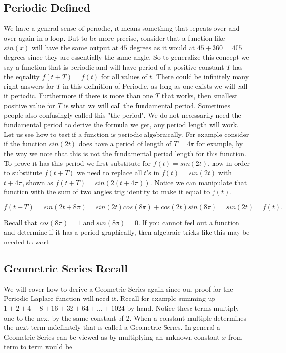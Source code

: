 \documentclass[12pt]{article}
\begin{document}
\subsection{Periodic Defined}

We have a general sense of periodic, it means something that repeats over and over again in a loop. But to be more precise, consider that a function like $sin(x)$ will have the same output at $45$ degrees as it would at $45+360=405$ degrees since they are essentially the same angle. So to generalize this concept we say a function that is periodic and will have period of a positive constant $T$ has the equality $f(t+T)=f(t)$ for all values of $t$. There could be infinitely many right answers for $T$ in this definition of Periodic, as long as one exists we will call it periodic. Furthermore if there is more than one $T$ that works, then smallest positive value for $T$ is what we will call the fundamental period. Sometimes people also confusingly called this "the period". We do not necessarily need the fundamental period to derive the formula we get, any period length will work. \\

Let us see how to test if a function is periodic algebraically. For example consider if the function $sin(2t)$ does have a period of length of $T=4\pi$ for example, by the way we note that this is not the fundamental period length for this function. To prove it has this period we first substitute for $f(t)=sin(2t)$, now in order to substitute $f(t+T)$ we need to replace all $t$'s in $f(t)=sin(2t)$ with $t+4\pi$, shown as $f(t+T)=sin(2(t+4\pi))$. Notice we can manipulate that function with the sum of two angles trig identity to make it equal to $f(t)$.

\begin{equation*}
    f(t+T)=sin(2t+8\pi)=sin(2t)cos(8\pi)+cos(2t)sin(8\pi)=sin(2t)=f(t).
\end{equation*}

Recall that $cos(8\pi)=1$ and $sin(8\pi)=0$. If you cannot feel out a function and determine if it has a period graphically, then algebraic tricks like this may be needed to work.

\subsection{Geometric Series Recall}

We will cover how to derive a Geometric Series again since our proof for the Periodic Laplace function will need it. Recall for example summing up $1+2+4+8+16+32+64+\ldots+1024$ by hand. Notice these terms multiply one to the next by the same constant of 2. When a constant multiple determines the next term indefinitely that is called a Geometric Series. In general a Geometric Series can be viewed as by multiplying an unknown constant $x$ from term to term would be
\end{document}
